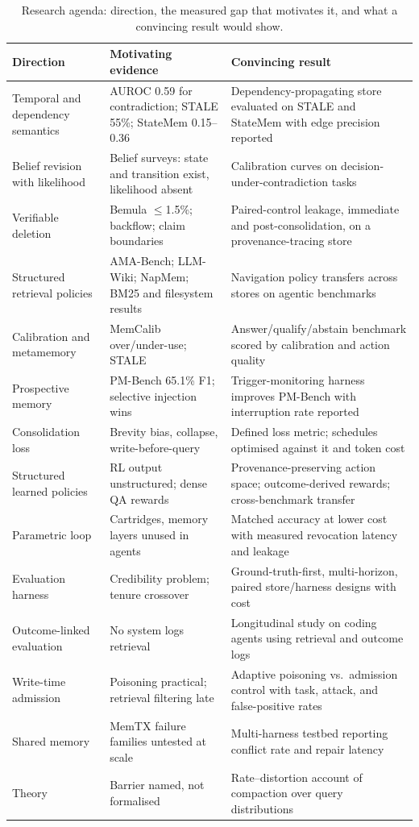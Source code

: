 \documentclass[11pt]{article}
\begin{document}
\begin{table}[tp]
\centering\small
\caption{Research agenda: direction, the measured gap that motivates it, and what a convincing result would show.}
\label{tab:agenda}
\begin{tabularx}{\textwidth}{L{3.4cm} X X}
\toprule
\textbf{Direction} & \textbf{Motivating evidence} & \textbf{Convincing result} \\
\midrule
Temporal and dependency semantics & AUROC 0.59 for contradiction; STALE 55\%; StateMem 0.15--0.36 & Dependency-propagating store evaluated on STALE and StateMem with edge precision reported \\
Belief revision with likelihood & Belief surveys: state and transition exist, likelihood absent & Calibration curves on decision-under-contradiction tasks \\
Verifiable deletion & Bemula $\le$1.5\%; backflow; claim boundaries & Paired-control leakage, immediate and post-consolidation, on a provenance-tracing store \\
Structured retrieval policies & AMA-Bench; LLM-Wiki; NapMem; BM25 and filesystem results & Navigation policy transfers across stores on agentic benchmarks \\
Calibration and metamemory & MemCalib over/under-use; STALE & Answer/qualify/abstain benchmark scored by calibration and action quality \\
Prospective memory & PM-Bench 65.1\% F1; selective injection wins & Trigger-monitoring harness improves PM-Bench with interruption rate reported \\
Consolidation loss & Brevity bias, collapse, write-before-query & Defined loss metric; schedules optimised against it and token cost \\
Structured learned policies & RL output unstructured; dense QA rewards & Provenance-preserving action space; outcome-derived rewards; cross-benchmark transfer \\
Parametric loop & Cartridges, memory layers unused in agents & Matched accuracy at lower cost with measured revocation latency and leakage \\
Evaluation harness & Credibility problem; tenure crossover & Ground-truth-first, multi-horizon, paired store/harness designs with cost \\
Outcome-linked evaluation & No system logs retrieval & Longitudinal study on coding agents using retrieval and outcome logs \\
Write-time admission & Poisoning practical; retrieval filtering late & Adaptive poisoning vs.\ admission control with task, attack, and false-positive rates \\
Shared memory & MemTX failure families untested at scale & Multi-harness testbed reporting conflict rate and repair latency \\
Theory & Barrier named, not formalised & Rate--distortion account of compaction over query distributions \\
\bottomrule
\end{tabularx}
\end{table}
\end{document}
